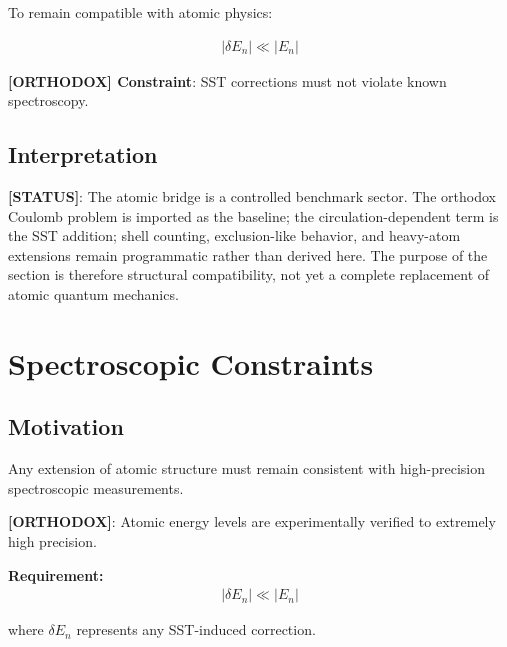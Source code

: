 \documentclass[11pt]{article}
\theoremstyle{definition}
\theoremstyle{plain}
\theoremstyle{remark}
\begin{document}
        To remain compatible with atomic physics:
        
        \begin{align}
            |\delta E_n| \ll |E_n|
        \end{align}
        
        \textbf{[ORTHODOX] Constraint}: SST corrections must not violate known spectroscopy.
    
    \subsection{Interpretation}
        
        \textbf{[STATUS]}: The atomic bridge is a controlled benchmark sector. The orthodox Coulomb problem is imported as the baseline; the circulation-dependent term is the SST addition; shell counting, exclusion-like behavior, and heavy-atom extensions remain programmatic rather than derived here. The purpose of the section is therefore structural compatibility, not yet a complete replacement of atomic quantum mechanics.

        
\section{Spectroscopic Constraints}
    \label{sec:spectroscopy}
    
    \subsection{Motivation}
        
        Any extension of atomic structure must remain consistent with high-precision spectroscopic measurements.
        
        \textbf{[ORTHODOX]}:
        Atomic energy levels are experimentally verified to extremely high precision.
        
        \textbf{Requirement:}
        \begin{align}
            |\delta E_n| \ll |E_n|
            \label{eq:spectro_constraint}
        \end{align}
        
        where $\delta E_n$ represents any SST-induced correction.
    
\end{document}
